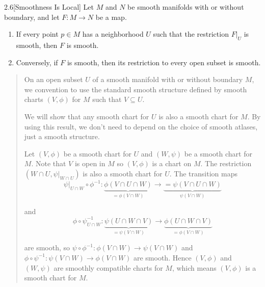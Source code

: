 \begin{prop}{2.6}[Smoothness Is Local]
    Let \( M \) and \( N \) be smooth manifolds with or without boundary, and let \( F: M \to N \) be a map.
    \begin{enumerate}[itemsep=0pt,label={(\alph*)}]
        \item If every point \( p \in M \) has a neighborhood \( U \) such that the restriction \( F\vert_{U} \) is smooth, then \( F \) is smooth.
        \item Conversely, if \( F \) is smooth, then its restriction to every open subset is smooth.
    \end{enumerate}
\end{prop}

\begin{quotation}
    On an open subset \( U \) of a smooth manifold with or without boundary \( M \), we convention to use the standard smooth structure defined by smooth charts \( (V, \phi) \) for \( M \) such that \( V \subseteq U \).

    We will show that any smooth chart for \( U \) is also a smooth chart for \( M \). By using this result, we don't need to depend on the choice of smooth atlases, just a smooth structure.

    Let \( (V, \phi) \) be a smooth chart for \( U \) and \( (W, \psi) \) be a smooth chart for \( M \). Note that \( V \) is open in \( M \) so \( (V, \phi) \) is a chart on \( M \). The restriction \( (W \cap U, \psi\vert_{W \cap U}) \) is also a smooth chart for \( U \). The transition maps
    \[
        \psi\vert_{U \cap W} \circ \phi^{-1}: \underbrace{\phi(V \cap U \cap W)}_{= \phi(V \cap W)} \to \underbrace{= \psi(V \cap U \cap W)}_{\psi(V \cap W)}
    \]

    and
    \[
        \phi \circ \psi_{U \cap W}^{-1}: \underbrace{\psi(U \cap W \cap V)}_{= \psi(V \cap W)} \to \underbrace{\phi(U \cap W \cap V)}_{= \phi(V \cap W)}
    \]

    are smooth, so \( \psi \circ \phi^{-1}: \phi(V \cap W) \to \psi(V \cap W) \) and \( \phi \circ \psi^{-1}: \psi(V \cap W) \to \phi(V \cap W) \) are smooth. Hence \( (V, \phi) \) and \( (W, \psi) \) are smoothly compatible charts for \( M \), which means \( (V, \phi) \) is a smooth chart for \( M \).
\end{quotation}

